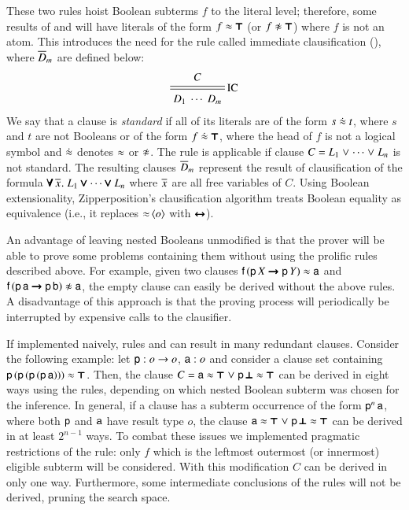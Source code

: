 \newcommand{\eqneq}{\mathrel{\dot{\eq}}}
These two rules hoist Boolean subterms $f$ to the literal level; therefore,
some results of  and  will have literals of the form $f \approx \pmb{\top}$ (or
$f \noteq \itrue$) where $f$ is not an atom. This introduces the need for the rule
called immediate clausification (), where $\overline{D}_{m}$ are defined below:
%
$$ \namedsimp{IC}{C}{D_1 \; \cdots \; D_m} $$
%
We say that a clause is \emph{standard} if all of its literals are of the form $s \eqneq t$,
where $s$ and $t$ are not Booleans or of the form $f \eqneq \itrue$, where the head of $f$
is not a logical symbol and $\eqneq$ denotes $\approx$ or $\not\approx$. The rule 
is applicable if clause $C = L_1 \mathrel\lor
\cdots \mathrel\lor L_n$ is not standard.
The resulting clauses $\overline{D}_{m}$ represent
the result of clausification of the formula $\pmb{\forall}\,\overline{x}_{}. \; L_1 \pmb{\lor}
\cdots \pmb{\lor} L_n$ where $\overline{x}_{}$ are all free variables of $C$.
Using Boolean extensionality, Zipperposition's clausification
algorithm treats Boolean equality as equivalence (i.e., it replaces
$\mathop{\approx}{\langle o\rangle}$ with $\pmb{\leftrightarrow}$).

An advantage of leaving nested Booleans unmodified is that the prover will be able
to prove some problems containing them without using the prolific rules described
above. For example, given two clauses $\mathsf{f} \, (\mathsf{p} \, X
\pmb{\rightarrow} \mathsf{p} \, Y) \approx \mathsf{a}$ and $\cst{f} \, (\cst{p} \,
\cst{a} \iimplies \cst{p} \, \cst{b}) \noteq \cst{a}$, the empty clause can
easily be derived without the above rules. A disadvantage of this approach
is that the proving process will periodically be interrupted by expensive calls
to the clausifier.
\pagebreak[2]

If implemented naively, rules  and  can result
in many redundant clauses. Consider the following example: let $\mathsf{p} : o
\rightarrow o$, $\mathsf{a} : o$ and consider a clause set containing $\mathsf{p} \,
(\mathsf{p} \, (\mathsf{p} \, (\mathsf{p} \, \mathsf{a}))) \approx \pmb{\top}$. Then, the clause $C
= \mathsf{a} \approx \pmb{\top} \mathrel\lor \mathsf{p} \, \pmb{\bot} \approx \pmb{\top}$ can be derived in
eight ways using the rules, depending on which nested Boolean subterm was chosen
for the inference. In general, if a clause has a subterm occurrence of the form
$\mathsf{p}^n \, \mathsf{a}$, where both $\mathsf{p}$ and $\mathsf{a}$ have result type $o$,
the clause $\mathsf{a} \approx \pmb{\top} \mathrel\lor \mathsf{p} \, \pmb{\bot} \approx \pmb{\top}$ can be
derived in at least $2^{n-1}$ ways.
To combat these issues we
implemented pragmatic restrictions of the rule: only $f$ which is
the leftmost outermost (or innermost) eligible subterm will be considered. With
this modification $C$ can be derived in only one way. Furthermore,
some intermediate conclusions of the rules will not be derived, pruning the search space.


